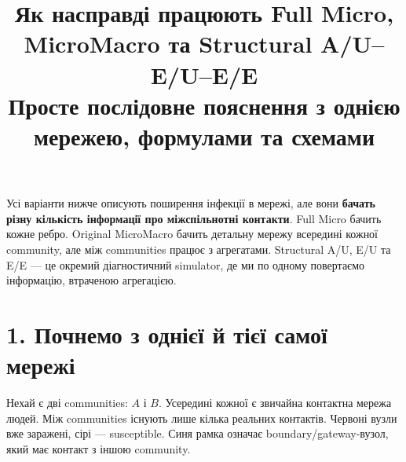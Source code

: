 \documentclass[11pt,a4paper]{article}
\title{\textbf{Як насправді працюють Full Micro, MicroMacro та Structural A/U--E/U--E/E}\\[4pt]
\large Просте послідовне пояснення з однією мережею, формулами та схемами}
\author{}
\date{}
\begin{document}
\maketitle
\vspace{-1.5em}

\begin{tcolorbox}[colback=soft,colframe=boundary,title=Що треба зрозуміти з цього тексту]
Усі варіанти нижче описують поширення інфекції в мережі, але вони \textbf{бачать різну кількість інформації про міжспільнотні контакти}. Full Micro бачить кожне ребро. Original MicroMacro бачить детальну мережу всередині кожної community, але між communities працює з агрегатами. Structural A/U, E/U та E/E --- це окремий діагностичний simulator, де ми по одному повертаємо інформацію, втраченою агрегацією.
\end{tcolorbox}

\section*{1. Почнемо з однієї й тієї самої мережі}

Нехай є дві communities: $A$ і $B$. Усередині кожної є звичайна контактна мережа людей. Між communities існують лише кілька реальних контактів. Червоні вузли вже заражені, сірі --- susceptible. Синя рамка означає boundary/gateway-вузол, який має контакт з іншою community.
\end{document}

